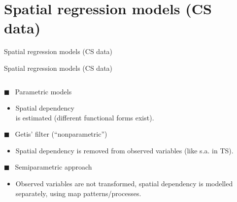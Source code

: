 \documentclass{beamer}
\begin{document}
\section{Spatial regression models (CS data)}
\begin{frame}{Spatial regression models (CS data)}
\end{frame}
\begin{frame}{Spatial regression models (CS data)}
\begin{columns}[T] %
\begin{column}{.48\textwidth}
\vspace{-0.1cm}
$\blacksquare~~$ Parametric models \\
\vspace{-0.1cm}
        \begin{itemize}
        \item Spatial dependency \\is estimated (different functional forms exist).
        \end{itemize}
        \smallskip
$\blacksquare~~$ Getis' filter (``nonparametric'')\\
\vspace{-0.1cm}
        \begin{itemize}
        \item Spatial dependency is removed from observed variables (like s.a. in TS).
        \end{itemize}
        \smallskip
$\blacksquare~~$ Semiparametric approach \\
\vspace{-0.1cm}
        \begin{itemize}
        \item Observed variables are not transformed, spatial dependency is modelled separately, using map patterns/processes.
        \end{itemize}


\end{column}
\end{columns}
\end{frame}
\end{document}
